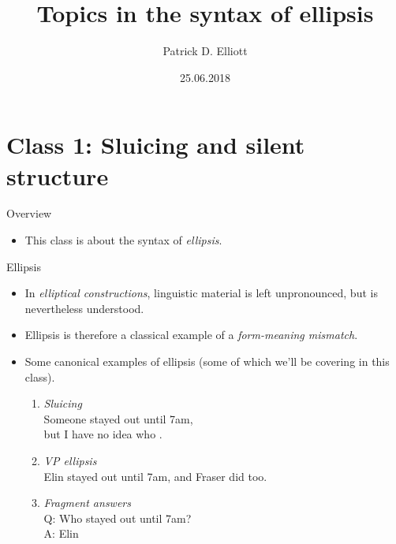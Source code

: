 \documentclass[ignorenonframetext,]{beamer}
\title{Topics in the syntax of ellipsis}
\author{Patrick D. Elliott}
\date{25.06.2018}
\providecommand{\tightlist}{%
  \setlength{\itemsep}{0pt}\setlength{\parskip}{0pt}}
\begin{document}
\frame{\titlepage}

\hypertarget{class-1-sluicing-and-silent-structure}{%
\section{Class 1: Sluicing and silent
structure}\label{class-1-sluicing-and-silent-structure}}

\begin{frame}{%
\protect\hypertarget{overview}{%
Overview}}

\begin{itemize}
\tightlist
\item
  This class is about the syntax of \emph{ellipsis}.
\end{itemize}

\end{frame}

\begin{frame}{%
\protect\hypertarget{ellipsis}{%
Ellipsis}}

\begin{itemize}
\item
  In \emph{elliptical constructions}, linguistic material is left
  unpronounced, but is nevertheless understood.
\item
  Ellipsis is therefore a classical example of a \emph{form-meaning
  mismatch}.
\item
  Some canonical examples of ellipsis (some of which we’ll be covering
  in this class).

  \begin{enumerate}
  [(1)]
  \item
    \emph{Sluicing}\\
    Someone stayed out until 7am,\\
    but I have no idea who .
  \item
    \emph{VP ellipsis}\\
    Elin stayed out until 7am, and Fraser did
     too.
  \item
    \emph{Fragment answers}\\
    Q: Who stayed out until 7am?\\
    A: Elin 
  \end{enumerate}
\end{itemize}

\end{frame}
\end{document}
